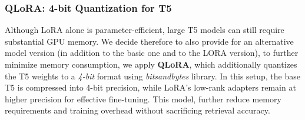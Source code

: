 \subsubsection{QLoRA: 4-bit Quantization for T5}
Although LoRA alone is parameter-efficient, large T5 models can still require substantial GPU memory. We decide therefore to also provide for an alternative model version (in addition to the basic one and to the LORA version), to further minimize memory consumption, we apply \textbf{QLoRA}, which additionally quantizes the T5 weights to a \emph{4-bit} format using \textit{bitsandbytes} library. In this setup, the base T5 is compressed into 4-bit precision, while LoRA’s low-rank adapters remain at higher precision for effective fine-tuning. This model, further reduce memory requirements and training overhead without sacrificing retrieval accuracy.